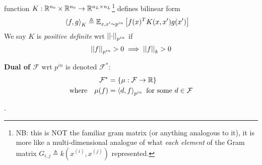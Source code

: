 \documentclass[11pt]{article}
\begin{document}
\begin{compactitem}
		\item {} function $K: \R^{n_0} \times \R^{n_0} \to \R^{n_L \times n_L}$\footnote{NB: this is NOT the familiar gram matrix (or anything analogous to it), it is more like a multi-dimensional analogue of what \textit{each element} of the Gram matrix $G_{i,j} \triangleq k(x^{(i)}, x^{(j)})$ represented.} defines bilinear form 
		\begin{align}
			\innerprod{f}{g}_K
				&\triangleq \E[x, x' \sim p^{in}]{f(x)^T K(x, x') g(x')}
		\end{align}
		We say $K$ is \textit{positive definite} wrt $\norm[p^{in}]{\cdot}$ if 
		$$
			\norm[p^{in}]{f} > 0 \implies \norm[k]{f} > 0
		$$
		
		
		\item \textbf{Dual of $\mathcal F$} wrt $p^{in}$ is denoted $\mathcal F^*$:
		\begin{align}
			\mathcal F^* 	
				&= \{\mu : \mathcal F \to \R \} \\
			\text{where} \quad 
			\mu(f) 
					&= \innerprod{d}{f}_{p^{in}} \text{ for some } d \in \mathcal F
		\end{align}
	\end{compactitem}


. 
\end{document}
